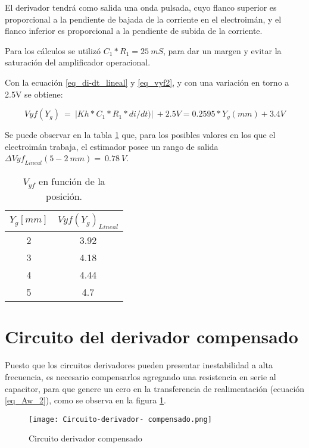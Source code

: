 \noindent El derivador tendr\'{a} como salida una onda pulsada, cuyo flanco superior  es proporcional a la pendiente de bajada de la corriente en el electroim\'{a}n, y el flanco inferior es proporcional a la pendiente de subida de la corriente. 

\noindent Para los c\'{a}lculos se utiliz\'{o} $C_1*R_1= 25\: mS$, para dar un margen y evitar la saturaci\'{o}n del amplificador operacional.  

\noindent Con la ecuaci\'{o}n \ref{eq_di-dt_lineal} y \ref{eq_vyf2}, y con una variaci\'{o}n en torno a 2.5V se obtiene:


\begin{equation} \label{eq_Vyf-lineal}
	Vyf(Y_g)\ =\ |Kh*C_1*R_1*di/dt)|\ +2.5V=0.2595*Y_g(mm)+3.4V
\end{equation}

\noindent Se puede observar en la tabla \ref{tab_Vyf_vs_y} que, para los posibles valores en los que el electroim\'{a}n trabaja, el estimador posee un rango de salida ${\mathit{\Delta}{Vyf}_{Lineal}}(5-2\ mm)=\ 0.78\ V$.

\begin{table}[H]
	\begin{center}
		\begin{tabular}{| c | c |}
			\hline
			$Y_g[mm]$ & ${Vyf(Y_g)}_{Lineal}$\\ \hline
			2 & 3.92 \\ \hline 
			3 & 4.18 \\ \hline 
			4 & 4.44 \\ \hline 
			5 & 4.7 \\ \hline 
		\end{tabular}
		\caption{$V_{yf}$ en función de la posición.}
		\label{tab_Vyf_vs_y}
	\end{center}
\end{table}

\section{Circuito del derivador compensado}

\noindent Puesto que los circuitos derivadores pueden presentar inestabilidad a alta frecuencia, es necesario compensarlos agregando una resistencia en serie al capacitor, para que genere un cero en la transferencia de realimentaci\'{o}n (ecuación \ref{eq_Aw_2}), como se observa en la figura  \ref{fig:img_Circuito_derivador_compensado}.

\begin{figure}[H]
	\centering
	\texttt{[image: Circuito-derivador- compensado.png]}
	\caption{Circuito derivador compensado}
	\label{fig:img_Circuito_derivador_compensado}
\end{figure}

